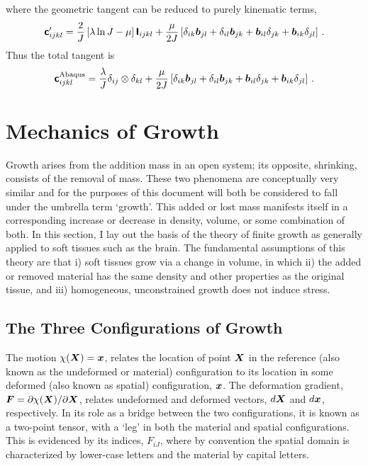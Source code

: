 \documentclass[10pt,letterpaper,oneside]{report}
\newcommand{\ten}[1]{\mbox{\boldmath $#1$}{}}
\newcommand{\tenf}[1]{\mbox{{\sffamily{\bfseries {#1}}}}}
\newcommand{\scas}[1]{\mbox{{\scriptsize{${\rm{#1}}$}}}{}}
\begin{document}
\begin{itemize}
\begin{equation}
\end{equation}
where the geometric tangent can be reduced to purely kinematic terms, 
\begin{equation}
\tenf{c}'_{ijkl} = \frac{2}{J} \left[ \lambda \ln J - \mu \right] \tenf{I}_{ijkl} + \frac{\mu}{2 J} \left[ \delta_{ik} \ten{b}_{jl} + \delta_{il} \ten{b}_{jk} + \ten{b}_{il} \delta_{jk} + \ten{b}_{ik} \delta_{jl} \right] \, . 
\end{equation}
Thus the total tangent is
\begin{equation}
\tenf{c}^{\scas{Abaqus}}_{ijkl} = \frac{\lambda}{J} \delta_{ij} \otimes \delta_{kl} + \frac{\mu}{2 J} \left[ \delta_{ik} \ten{b}_{jl} + \delta_{il} \ten{b}_{jk} + \ten{b}_{il} \delta_{jk} + \ten{b}_{ik} \delta_{jl} \right] \, . 
\end{equation}



\chapter{Mechanics of Growth}
\label{chap:mechofgrowth}
Growth arises from the addition mass in an open system; its opposite, shrinking, consists of the removal of mass.  These two phenomena are conceptually very similar and for the purposes of this document will both be considered to fall under the umbrella term `growth'.  This added or lost mass manifests itself in a corresponding increase or decrease in density, volume, or some combination of both.  
In this section, I lay out the basis of the theory of finite growth as generally applied to soft tissues such as the brain.  The fundamental assumptions of this theory are that i) soft tissues grow via a change in volume, in which ii) the added or removed material has the same density and other properties as the original tissue, and iii) homogeneous, unconstrained growth does not induce stress.

\section{The Three Configurations of Growth}
The motion $\chi ( \ten{X} ) = \ten{x}$, relates the location of point $\ten{X}$ in the reference (also known as the undeformed or material) configuration to its location in some deformed (also known as spatial) configuration, $\ten{x}$.  The deformation gradient, $\ten{F} = \partial \chi ( \ten{X} ) / \partial \ten{X}$, relates undeformed and deformed vectors, $d \ten{X}$ and $d \ten{x}$, respectively.  In its role as a bridge between the two configurations, it is known as a two-point tensor, with a `leg' in both the material and spatial configurations.  This is evidenced by its indices, $F_{iJ}$, where by convention the spatial domain is characterized by lower-case letters and the material by capital letters.


\end{itemize}
\end{document}

